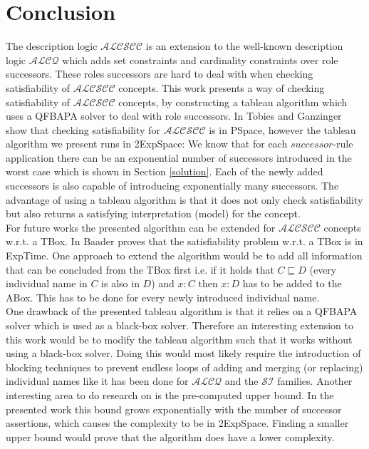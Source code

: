 \documentclass{book}
\theoremstyle{break}
\theoremstyle{definition}
\begin{document}
\chapter{Conclusion}
The description logic $\mathcal{ALCSCC}$ is an extension to the well-known description logic $\mathcal{ALCQ}$ which adds set constraints and cardinality constraints over role successors. These roles successors are   hard to deal with when checking satisfiability of $\mathcal{ALCSCC}$ concepts. This work presents a way of checking satisfiability of $\mathcal{ALCSCC}$ concepts, by constructing a tableau algorithm which uses a QFBAPA solver to deal with role successors. In \cite{pspace} Tobies and Ganzinger show that checking satisfiability for $\mathcal{ALCSCC}$ is in PSpace, however the tableau algorithm we present runs in 2ExpSpace: We know that for each $successor$-rule application there can be an exponential number of successors introduced in the worst case which is shown in Section \ref{solution}. Each of the newly added successors is also capable of introducing exponentially many successors. The advantage of using a tableau algorithm is that it does not only check satisfiability but also returns a satisfying interpretation (model) for the concept.\\
For future works the presented algorithm can be extended for $\mathcal{ALCSCC}$ concepts w.r.t. a TBox. In \cite{4} Baader proves that the satisfiability problem w.r.t. a TBox is in ExpTime. One approach to extend the algorithm would be to add all information that can be concluded from the TBox first i.e. if it holds that $C\sqsubseteq D$ (every individual name in $C$ is also in $D$) and $x:C$ then $x:D$ has to be added to the ABox. This has to be done for every newly introduced individual name.\\
One drawback of the presented tableau algorithm is that it relies on a QFBAPA solver which is used as a black-box solver. Therefore an interesting extension to this work would be to modify the tableau algorithm such that it works without using a black-box solver. Doing this would most likely require the introduction of blocking techniques to prevent endless loops of adding and merging (or replacing) individual names like it has been done for $\mathcal{ALCQ}$ and the $\mathcal{SI}$ families. Another interesting area to do research on is the pre-computed upper bound. In the presented work this bound grows exponentially with the number of successor assertions, which causes the complexity to be in 2ExpSpace. Finding a smaller upper bound would prove that the algorithm does have a lower complexity.
\normalem


\end{document}
